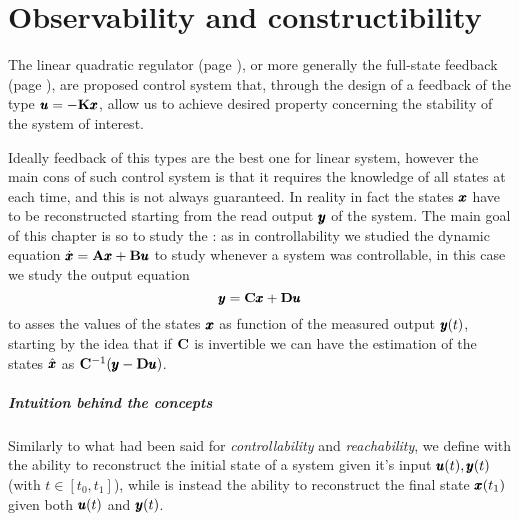 \chapter{Observability and constructibility}
	The linear quadratic regulator (page \pageref{sec:LQR}), or more generally the full-state feedback (page \pageref{sec:fullstatefeed}), are proposed control system that, through the design of a feedback of the type $\pmb{u} = -\mathbf{K}\pmb{x}$, allow us to achieve desired property concerning the stability of the system of interest.
	
	Ideally feedback of this types are the best one for linear system, however the main cons of such control system is that it requires the knowledge of all states at each time, and this is not always guaranteed. In reality in fact the states $\pmb{x}$ have to be reconstructed starting from the read output $\pmb{y}$ of the system. The main goal of this chapter is so to study the : as in controllability we studied the dynamic equation $\dot{\pmb{x}} = \mathbf{A}\pmb{x} + \mathbf{B}\pmb{u}$ to study whenever a system was controllable, in this case we study the output equation
	\[ \pmb{y} = \mathbf{C}\pmb{x} + \mathbf{D}\pmb{u} \]
	to asses the values of the states $\pmb{x}$ as function of the measured output $\pmb{y}(t)$, starting by the idea that if $\mathbf{C}$ is invertible we can have the estimation of the states $\hat {\pmb{x}}$ as $\mathbf{C}^{-1}(\pmb{y}-\mathbf{D}\pmb{u})$.
	
	\paragraph{Intuition behind the concepts} Similarly to what had been said for \textit{controllability} and \textit{reachability}, we define with  the ability to reconstruct the initial state of a system given it's input $\pmb{u}(t),\pmb{y}(t)$ (with $t\in[t_0,t_1]$), while  is instead the ability to reconstruct the final state $\pmb{x}(t_1)$ given both $\pmb{u}(t)$ and $\pmb{y}(t)$.
	
